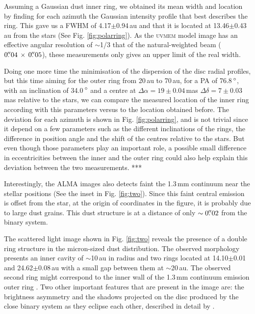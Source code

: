 \documentclass[letters, usenatbib]{mnras}
\begin{document}
Assuming a Gaussian dust inner ring, we obtained its mean width and location by finding for each azimuth the Gaussian intensity profile that best describes the ring. This gave us a FWHM of 4.17$\pm$0.94\,au and that it is located at 13.46$\pm$0.43\,au from the stars (See Fig. \ref{fig:polarring}). As the \textsc{uvmem} model image has an effective angular resolution of $\sim$1/3 that of the natural-weighted beam ($0\hbox{$.\!\!^{\prime\prime}$}04 \,\times \, 0\hbox{$.\!\!^{\prime\prime}$}05$), these measurements only gives an upper limit of the real width.

Doing one more time the minimisation of the dispersion of the disc radial profiles, but this time aiming for the outer ring from 20\,au to 70\,au, for a PA of 76.8\,$\hbox{$^\circ$}$, with an inclination of 34.0\,$\hbox{$^\circ$}$ and a centre at $\Delta \alpha = 19\pm0.04$\,mas $\Delta \delta = 7\pm0.03$\,mas relative to the stars, we can compare the measured location of the inner ring according with this parameters versus to the location obtained before. The deviation for each azimuth is shown in Fig. \ref{fig:polarring}, and is not trivial since it depend on a few parameters such as the different inclinations of the rings, the difference in position angle and the shift of the centres relative to the stars. But even though those parameters play an important role, a possible small difference in eccentricities between the inner and the outer ring could also help explain this deviation between the two measurements. ***

Interestingly, the ALMA images also detects faint the 1.3\,mm continuum near the stellar positions (See the inset in Fig. \ref{fig:two}). Since this faint central emission is offset from the star, at the origin of coordinates in the figure, it is probably due to large dust grains. This dust structure is at a distance of only $\sim0\hbox{$.\!\!^{\prime\prime}$}02$ from the binary system.

The scattered light image shown in Fig. \ref{fig:two} reveals the presence of a double ring structure in the micron-sized dust distribution. The observed morphology presents an inner cavity of $\sim$10\,au in radius and two rings located at 14.10$\pm$0.01 and 24.62$\pm$0.08\,au with a small gap between them at $\sim$20\,au. The observed second ring might correspond to the inner wall of the 1.3\,mm continuum emission outer ring \citep{Ru_z_Rodr_guez_2019}. Two other important features that are present in the image are: the brightness asymmetry and the shadows projected on the disc produced by the close binary system as they eclipse each other, described in detail by \citet{dOrazi}.
\end{document}
